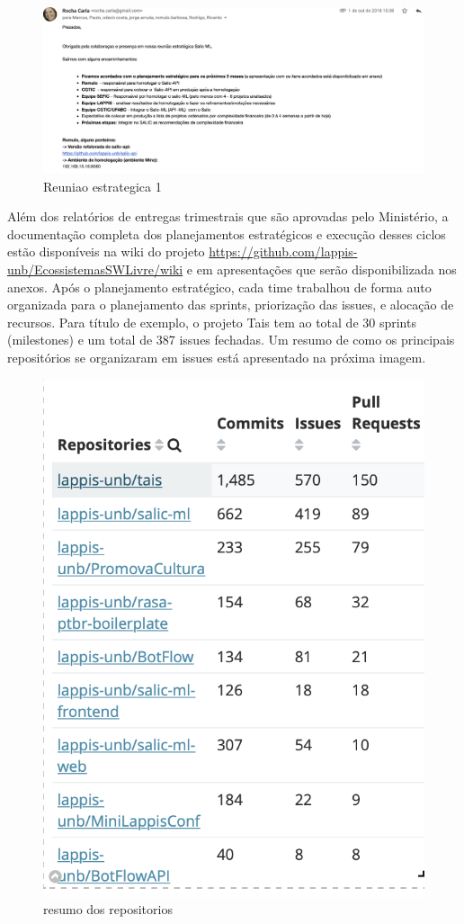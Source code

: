 \begin{figure}
\centering
\includegraphics{figs/estrategico1.png}
\caption{Reuniao estrategica 1}
\end{figure}

Além dos relatórios de entregas trimestrais que são aprovadas pelo
Ministério, a documentação completa dos planejamentos estratégicos e
execução desses ciclos estão disponíveis na wiki do projeto
\url{https://github.com/lappis-unb/EcossistemasSWLivre/wiki} e em
apresentações que serão disponibilizada nos anexos. Após o planejamento
estratégico, cada time trabalhou de forma auto organizada para o
planejamento das sprints, priorização das issues, e alocação de
recursos. Para título de exemplo, o projeto Tais tem ao total de 30
sprints (milestones) e um total de 387 issues fechadas. Um resumo de
como os principais repositórios se organizaram em issues está
apresentado na próxima imagem.

\begin{figure}
\centering
\includegraphics{figs/total.png}
\caption{resumo dos repositorios}
\end{figure}

